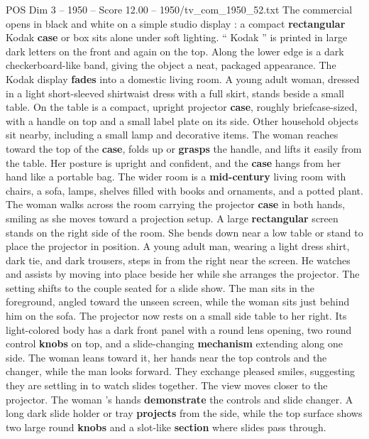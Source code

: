 \begin{textsample}{POS Dim 3 – 1950 – Score 12.00 – 1950/tv\_com\_1950\_52.txt}  \label{ex:f3_pos_015}
The commercial opens in black and white on a simple studio display : a compact \textbf{rectangular} Kodak \textbf{case} or box sits alone under soft lighting. “ Kodak ” is printed in large dark letters on the front and again on the top.
Along the lower edge is a dark checkerboard-like band, giving the object a neat, packaged appearance.
The Kodak display \textbf{fades} into a domestic living room.
A young adult woman, dressed in a light short-sleeved shirtwaist dress with a full skirt, stands beside a small table.
On the table is a compact, upright projector \textbf{case}, roughly briefcase-sized, with a handle on top and a small label plate on its side.
Other household objects sit nearby, including a small lamp and decorative items.
The woman reaches toward the top of the \textbf{case}, folds up or \textbf{grasps} the handle, and lifts it easily from the table.
Her posture is upright and confident, and the \textbf{case} hangs from her hand like a portable bag.
The wider room is a \textbf{mid-century} living room with chairs, a sofa, lamps, shelves filled with books and ornaments, and a potted plant.
The woman walks across the room carrying the projector \textbf{case} in both hands, smiling as she moves toward a projection setup.
A large \textbf{rectangular} screen stands on the right side of the room.
She bends down near a low table or stand to place the projector in position.
A young adult man, wearing a light dress shirt, dark tie, and dark trousers, steps in from the right near the screen.
He watches and assists by moving into place beside her while she arranges the projector.
The setting shifts to the couple seated for a slide show.
The man sits in the foreground, angled toward the unseen screen, while the woman sits just behind him on the sofa.
The projector now rests on a small side table to her right.
Its light-colored body has a dark front panel with a round lens opening, two round control \textbf{knobs} on top, and a slide-changing \textbf{mechanism} extending along one side.
The woman leans toward it, her hands near the top controls and the changer, while the man looks forward.
They exchange pleased smiles, suggesting they are settling in to watch slides together.
The view moves closer to the projector.
The woman ’s hands \textbf{demonstrate} the controls and slide changer.
A long dark slide holder or tray \textbf{projects} from the side, while the top surface shows two large round \textbf{knobs} and a slot-like \textbf{section} where slides pass through.

\end{textsample}
